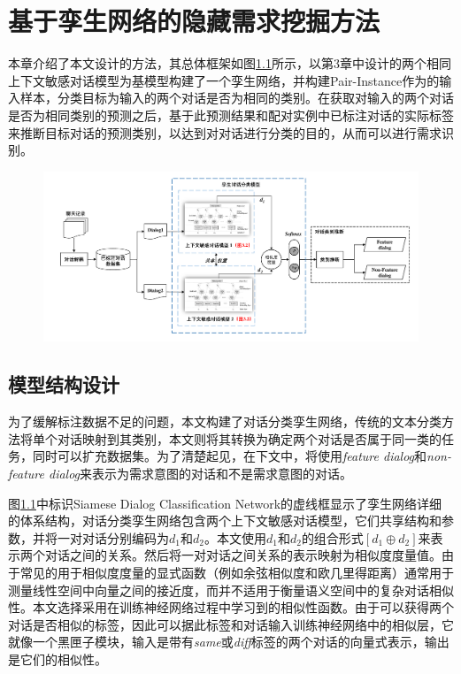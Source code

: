 \chapter{基于孪生网络的隐藏需求挖掘方法}
本章介绍了本文设计的{\tool}方法，其总体框架如图\ref{fig:approach}所示，{\tool}以第3章中设计的两个相同上下文敏感对话模型{\dm}为基模型构建了一个孪生网络，并构建Pair-Instance作为{\tool}的输入样本，分类目标为输入的两个对话是否为相同的类别。在获取{\tool}对输入的两个对话是否为相同类别的预测之后，{\tool}基于此预测结果和配对实例中已标注对话的实际标签来推断目标对话的预测类别，以达到对对话进行分类的目的，从而可以进行需求识别。
\begin{figure}[htbp]
    \centering
    \includegraphics[width=\textwidth]{Img/approach.pdf}
    \label{fig:approach}
\end{figure}


\section{{\tool}模型结构设计}
为了缓解标注数据不足的问题，本文构建了对话分类孪生网络，传统的文本分类方法将单个对话映射到其类别，本文则将其转换为确定两个对话是否属于同一类的任务，同时可以扩充数据集。为了清楚起见，在下文中，将使用\textit{feature dialog}和\textit{non-feature dialog}来表示为需求意图的对话和不是需求意图的对话。

图\ref{fig:approach}中标识Siamese Dialog Classification Network的虚线框显示了孪生网络详细的体系结构，对话分类孪生网络包含两个上下文敏感对话模型{\dm}，它们共享结构和参数，并将一对对话分别编码为$d_1$和$d_2$。本文使用$d_1$和$d_2$的组合形式$[{d_1}\oplus {d_2}]$来表示两个对话之间的关系。然后将一对对话之间关系的表示映射为相似度度量值。由于常见的用于相似度度量的显式函数（例如余弦相似度和欧几里得距离\cite{huang2008similarity}）通常用于测量线性空间中向量之间的接近度，而并不适用于衡量语义空间中的复杂对话相似性。本文选择采用在训练神经网络过程中学习到的相似性函数。由于可以获得两个对话是否相似的标签，因此可以据此标签和对话输入训练神经网络中的相似层，它就像一个黑匣子模块，输入是带有\textit{same}或\textit{diff}标签的两个对话的向量式表示，输出是它们的相似性。

